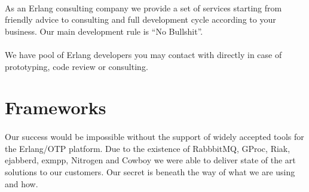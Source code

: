 \documentclass[11pt]{article}
\begin{document}
\paragraph{}
As an Erlang consulting company we provide a set of services starting from friendly advice to
consulting and full development cycle according to your business.
Our main development rule is ``No Bullshit''.

\paragraph{}
We have pool of Erlang developers you may contact with directly in case of
prototyping, code review or consulting.


\section*{Frameworks}
\paragraph{}
Our success would be impossible without the support of widely accepted tools for the Erlang/OTP platform.
Due to the existence of RabbbitMQ, GProc, Riak, ejabberd, exmpp, Nitrogen and
Cowboy we were able to deliver state of the art solutions to our customers. 
Our secret is beneath the way of what we are using and how.


\end{document}
